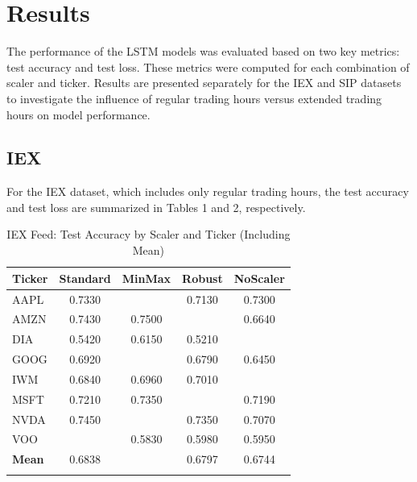 \documentclass[10pt,a4paper]{article}
\begin{document}
\section{Results}

The performance of the LSTM models was evaluated based on two key metrics: test accuracy and test loss. These metrics were computed for each combination of scaler and ticker. Results are presented separately for the IEX and SIP datasets to investigate the influence of regular trading hours versus extended trading hours on model performance.

\subsection{IEX}

For the IEX dataset, which includes only regular trading hours, the test accuracy and test loss are summarized in Tables 1 and 2, respectively.

\begin{table}[H]
\centering
{}
    \caption{IEX Feed: Test Accuracy by Scaler and Ticker (Including Mean)}
\begin{tabular}{lcccc}
\toprule
\textbf{Ticker} & \textbf{Standard} & \textbf{MinMax} & \textbf{Robust} & \textbf{NoScaler} \\
\midrule
AAPL  & 0.7330 & \cellcolor{lightgreen}{0.7470} & 0.7130 & 0.7300 \\
AMZN  & 0.7430 & 0.7500 & \cellcolor{lightgreen}{0.7540} & 0.6640 \\
DIA   & 0.5420 & 0.6150 & 0.5210 & \cellcolor{lightgreen}{0.6200} \\
GOOG  & 0.6920 & \cellcolor{lightgreen}{0.7070} & 0.6790 & 0.6450 \\
IWM   & 0.6840 & 0.6960 & 0.7010 & \cellcolor{lightgreen}{0.7150} \\
MSFT  & 0.7210 & 0.7350 & \cellcolor{lightgreen}{0.7370} & 0.7190 \\
NVDA  & 0.7450 & \cellcolor{lightgreen}{0.7520} & 0.7350 & 0.7070 \\
VOO   & \cellcolor{lightgreen}{0.6100} & 0.5830 & 0.5980 & 0.5950 \\
\midrule
\textbf{Mean} & 0.6838 & \cellcolor{lightgreen}{0.6981} & 0.6797 & 0.6744 \\
\bottomrule
\label{tab:iex_accuracy}
\end{tabular}
\end{table}
\end{document}
